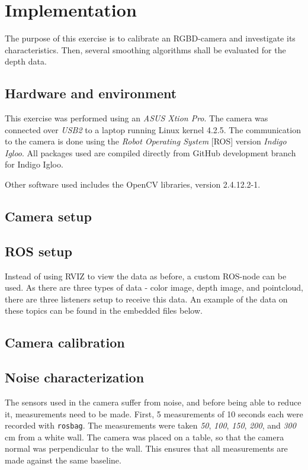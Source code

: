 \documentclass[11pt]{article}
\begin{document}
\section{Implementation}
The purpose of this exercise is to calibrate an RGBD-camera and investigate its characteristics. Then, several smoothing algorithms shall be evaluated for the depth data.
\subsection{Hardware and environment}
This exercise was performed using an \emph{ASUS Xtion Pro}. The camera was connected over \emph{USB2} to a laptop running Linux kernel 4.2.5. The communication to the camera is done using the \emph{Robot Operating System} [ROS] version \emph{Indigo Igloo}. All packages used are compiled directly from GitHub development branch for Indigo Igloo. \par
Other software used includes the OpenCV libraries, version 2.4.12.2-1.
\subsection{Camera setup}
\subsection{ROS setup}
Instead of using RVIZ to view the data as before, a custom ROS-node can be used. As there are three types of data - color image, depth image, and pointcloud, there are three listeners setup to receive this data. An example of the data on these topics can be found in the embedded files below. \par

\begin{center}
\end{center}
\subsection{Camera calibration}
   
  \subsection{Noise characterization}
  The sensors used in the camera suffer from noise, and before being able to reduce it, measurements need to be made. First, 5 measurements of 10 seconds each were recorded with \texttt{rosbag}. The measurements were taken \emph{50}, \emph{100}, \emph{150}, \emph{200}, and \emph{300} cm from a white wall. The camera was placed on a table, so that the  camera normal was perpendicular to the wall. This ensures that all measurements are made against the same baseline. \par
\end{document}

